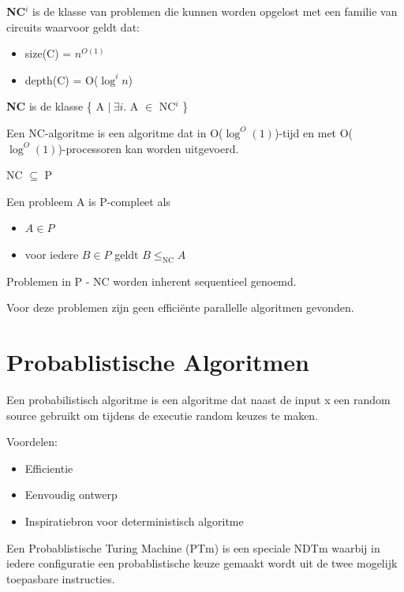 \documentclass[]{article}
\begin{document}
\textbf{NC$^i$} is de klasse van problemen die kunnen worden opgelost met een familie van circuits waarvoor geldt dat:

\begin{itemize}
\item size(C) = $n^{O(1)}$
\item depth(C) = O($\log^i n$)
\end{itemize}

\textbf{NC} is de klasse \{ A $ | ~ \exists i$. A $\in$ NC$^i$ \}

\medskip

Een NC-algoritme is een algoritme dat in O($\log^O(1)$)-tijd en met O($\log^O(1)$)-processoren kan worden uitgevoerd.

\medskip

NC $\subseteq$ P

\medskip

Een probleem A is P-compleet als
\begin{itemize}
\item $A \in P$
\item voor iedere $B \in P$ geldt $B \leq_\text{NC} A$
\end{itemize}

\medskip 

Problemen in P - NC worden inherent sequentieel genoemd.

Voor deze problemen zijn geen effici\"ente parallelle algoritmen gevonden.

\section*{Probablistische Algoritmen}

Een probabilistisch algoritme is een algoritme dat naast de input x een random source gebruikt om tijdens de executie random keuzes te maken.

\medskip

Voordelen:
\begin{itemize}
\item Efficientie
\item Eenvoudig ontwerp
\item Inspiratiebron voor deterministisch algoritme
\end{itemize}

\medskip

Een Probablistische Turing Machine (PTm) is een speciale NDTm waarbij in iedere configuratie een probablistische keuze gemaakt wordt uit de twee mogelijk toepasbare instructies.
\end{document}
